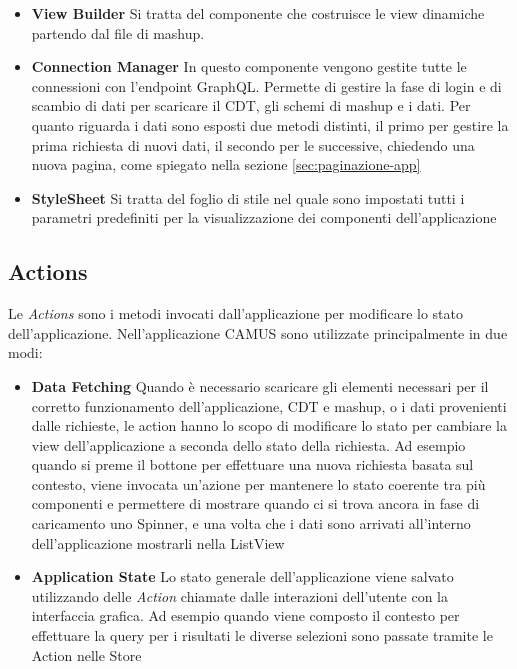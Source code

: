 \begin{itemize}
	\item \textbf{View Builder} Si tratta del componente che costruisce le view dinamiche partendo dal file di mashup. 
	\item \textbf{Connection Manager} In questo componente vengono gestite tutte le connessioni con l'endpoint GraphQL. Permette di gestire la fase di login e di scambio di dati per scaricare il CDT, gli schemi di mashup e i dati. Per quanto riguarda i dati sono esposti due metodi distinti, il primo per gestire la prima richiesta di nuovi dati, il secondo per le successive, chiedendo una nuova pagina, come spiegato nella sezione \ref{sec:paginazione-app}
	\item \textbf{StyleSheet} Si tratta del foglio di stile nel quale sono impostati tutti i parametri predefiniti per la visualizzazione dei componenti dell'applicazione
\end{itemize}

\subsection{Actions}\label{sec:actions}
Le \emph{Actions} sono i metodi invocati dall'applicazione per modificare lo stato dell'applicazione. Nell'applicazione CAMUS sono utilizzate principalmente in due modi: 
\begin{itemize}
	\item \textbf{Data Fetching} Quando è necessario scaricare gli elementi necessari per il corretto funzionamento dell'applicazione, CDT e mashup, o i dati provenienti dalle richieste, le action hanno lo scopo di modificare lo stato per cambiare la view dell'applicazione a seconda dello stato della richiesta.
	Ad esempio quando si preme il bottone per effettuare una nuova richiesta basata sul contesto, viene invocata un'azione per mantenere lo stato coerente tra più componenti e permettere di mostrare quando ci si trova ancora in fase di caricamento uno Spinner, e una volta che i dati sono arrivati all'interno dell'applicazione mostrarli nella ListView
	\item \textbf{Application State} Lo stato generale dell'applicazione viene salvato utilizzando delle \emph{Action} chiamate dalle interazioni dell'utente con la interfaccia grafica. Ad esempio quando viene composto il contesto per effettuare la query per i risultati le diverse selezioni sono passate tramite le Action nelle Store
\end{itemize}	

